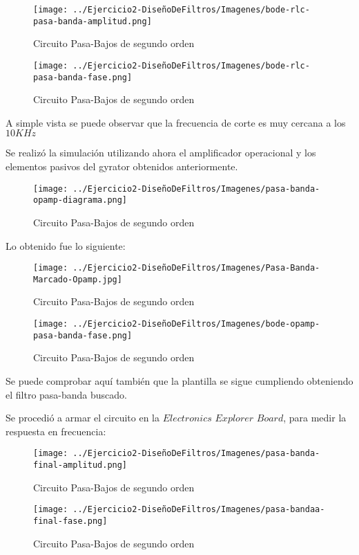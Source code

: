 \begin{figure}[H]
    \centering
    \texttt{[image: ../Ejercicio2-DiseñoDeFiltros/Imagenes/bode-rlc-pasa-banda-amplitud.png]}
    \caption{Circuito Pasa-Bajos de segundo orden}
\end{figure}

\begin{figure}[H]
    \centering
    \texttt{[image: ../Ejercicio2-DiseñoDeFiltros/Imagenes/bode-rlc-pasa-banda-fase.png]}
    \caption{Circuito Pasa-Bajos de segundo orden}
\end{figure}

A simple vista se puede observar que la frecuencia de corte es muy cercana a los $10 KHz$

Se realizó la simulación utilizando ahora el amplificador operacional y los elementos pasivos del gyrator obtenidos anteriormente.

\begin{figure}[H]
    \centering
    \texttt{[image: ../Ejercicio2-DiseñoDeFiltros/Imagenes/pasa-banda-opamp-diagrama.png]}
    \caption{Circuito Pasa-Bajos de segundo orden}
\end{figure}

Lo obtenido fue lo siguiente:

\begin{figure}[H]
    \centering
    \texttt{[image: ../Ejercicio2-DiseñoDeFiltros/Imagenes/Pasa-Banda-Marcado-Opamp.jpg]}
    \caption{Circuito Pasa-Bajos de segundo orden}
\end{figure}

\begin{figure}[H]
    \centering
    \texttt{[image: ../Ejercicio2-DiseñoDeFiltros/Imagenes/bode-opamp-pasa-banda-fase.png]}
    \caption{Circuito Pasa-Bajos de segundo orden}
\end{figure}

Se puede comprobar aquí también que la plantilla se sigue cumpliendo obteniendo el filtro pasa-banda buscado.

Se procedió a armar el circuito en la $Electronics$ $Explorer$ $Board$, para medir la respuesta en frecuencia:

\begin{figure}[H]
    \centering
    \texttt{[image: ../Ejercicio2-DiseñoDeFiltros/Imagenes/pasa-banda-final-amplitud.png]}
    \caption{Circuito Pasa-Bajos de segundo orden}
\end{figure}

\begin{figure}[H]
    \centering
    \texttt{[image: ../Ejercicio2-DiseñoDeFiltros/Imagenes/pasa-bandaa-final-fase.png]}
    \caption{Circuito Pasa-Bajos de segundo orden}
\end{figure}